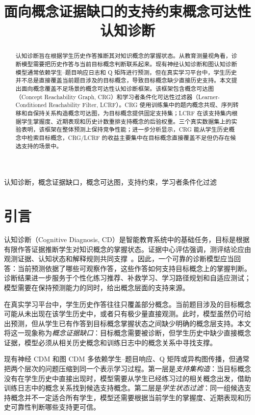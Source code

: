 \documentclass[conference]{IEEEtran}
\title{面向概念证据缺口的支持约束概念可达性认知诊断}
\author{
\IEEEauthorblockN{匿名作者}
\IEEEauthorblockA{匿名单位\\
Email: anonymous@example.com}
}
\begin{document}
\maketitle

\begin{abstract}
认知诊断旨在根据学生历史作答推断其对知识概念的掌握状态。从教育测量视角看，诊断模型需要把历史作答与当前目标概念判断联系起来。现有神经认知诊断和图认知诊断模型通常依赖学生--题目响应日志和 Q 矩阵进行预测，但在真实学习平台中，学生历史并不总是直接覆盖当前题目涉及的目标概念，导致目标概念缺少直接历史支持。本文提出面向概念覆盖不足场景的概念可达性认知诊断框架。该框架包含概念可达图（Concept Reachability Graph, CRG）和学习者条件化可达性过滤器（Learner-Conditioned Reachability Filter, LCRF）。CRG 使用训练集中的题内概念共现、序列转移和自保持关系构造概念可达图，为目标概念提供固定支持集；LCRF 在该支持集内根据学生掌握度、近期表现和历史计数重排支持概念的后验权重。三个真实数据集上的实验表明，该框架在整体预测上保持竞争性能；进一步分析显示，CRG 能从学生历史概念中检索目标概念，CRG/LCRF 的收益主要集中在目标概念直接覆盖不足但仍存在候选支持的场景中。
\end{abstract}

\begin{IEEEkeywords}
认知诊断，概念证据缺口，概念可达图，支持约束，学习者条件化过滤
\end{IEEEkeywords}

\section{引言}
认知诊断（Cognitive Diagnosis, CD）是智能教育系统中的基础任务，目标是根据有限作答证据推断学生对知识概念的掌握状态。证据中心评估强调，测评结论应由观测证据、认知状态和解释规则共同支撑~\cite{pellegrino2001knowing,mislevy2003structure}。因此，一个可靠的诊断模型应当回答：当前预测依据了哪些可观察作答，这些作答如何支持目标概念上的掌握判断。诊断结果进一步服务于个性化练习推荐、补救学习、学习路径规划和自适应测试；模型需要在保持预测能力的同时，给出概念层面的支持来源。

在真实学习平台中，学生历史作答往往只覆盖部分概念。当前题目涉及的目标概念可能从未出现在该学生历史中，或者只有极少量直接观测。此时，模型虽然仍可给出预测，但从学生已有作答到目标概念掌握状态之间缺少明确的概念层支持。本文将这一现象称为\emph{概念证据缺口}：目标概念需要被诊断，但学生历史中缺少直接概念证据，模型必须从相关历史概念和训练日志中的概念关系中寻找支撑。

现有神经 CDM 和图 CDM 多依赖学生--题目响应、Q 矩阵或异构图传播，但通常把两个层次的问题压缩到同一个表示学习过程。第一层是\emph{支持集构造}：当目标概念没有在学生历史中直接出现时，模型需要从学生已经练习过的相关概念出发，借助训练日志中的概念关系找到候选支持概念。第二层是\emph{学生状态过滤}：同一组候选支持概念并不一定适合所有学生，模型还需要根据当前学生的掌握度、近期表现和历史可靠性判断哪些支持更可信。
\end{document}
